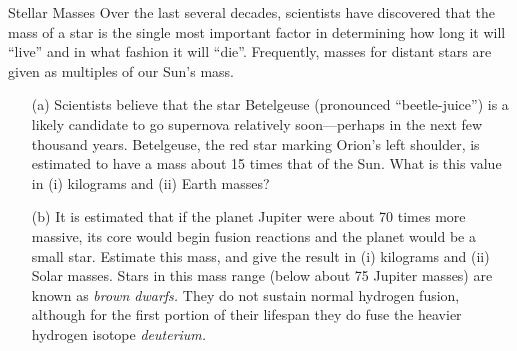 \documentclass[12pt]{article}
\begin{document}
\begin{probdesc}{4}{Stellar Masses}
Over the last several decades, scientists have discovered that the
mass of a star is the single most important factor in determining how
long it will ``live'' and in what fashion it will ``die''.
Frequently, masses for distant stars are given as multiples of our
Sun's mass.

\begin{enumerate}
\item[(a)] Scientists believe that the star Betelgeuse (pronounced
  ``beetle-juice'') is a likely candidate to go supernova relatively
  soon---perhaps in the next few thousand years.  Betelgeuse, the red
  star marking Orion's left shoulder, is estimated to have a mass
  about 15 times that of the Sun.  What is this value in (i) kilograms
  and (ii) Earth masses?

\item[(b)] It is estimated that if the planet Jupiter were about 70
  times more massive, its core would begin fusion reactions and the
  planet would be a small star.  Estimate this mass, and give the
  result in (i) kilograms and (ii) Solar masses.  Stars in this mass
  range (below about 75 Jupiter masses) are known as {\em brown
  dwarfs.}  They do not sustain normal hydrogen fusion, although for
  the first portion of their lifespan they do fuse the heavier
  hydrogen isotope {\em deuterium.}
\end{enumerate}
\end{probdesc}
\end{document}
